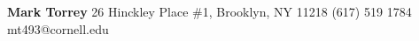 \documentclass[letterpaper]{article}
\begin{document}

\color{text1} %

	
\Huge \textbf{Mark Torrey} \hfill \small 26 Hinckley Place \#1, Brooklyn, NY 11218 \color{headings}\raisebox{-3pt}{\Phone} \color{text1}(617) 519 1784 \color{headings}{\raisebox{-3pt}{\Envelope}} \color{text1}mt493@cornell.edu\\
\vspace{14pt} %
\color{headings}\hrulefill %
\color{text1} %

\end{document}
